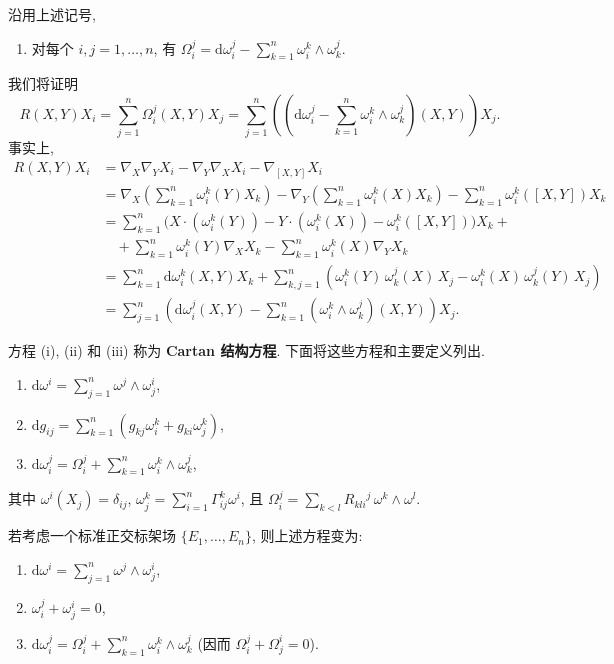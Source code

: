 \begin{RiemannProposition}\label{prop:cartan-equation-for-curvature-forms}
沿用上述记号,
\begin{enumerate}[label=(\roman*),start=3,leftmargin=*]
\item 对每个 $i,j=1,\ldots,n$, 有 $\Omega_i^j=\mathrm{d}\omega_i^j-\sum_{k=1}^n\omega_i^k\wedge\omega_k^j$.
\end{enumerate}
\end{RiemannProposition}

\begin{RiemannProof}
我们将证明
\[
  R(X,Y)X_i=\sum_{j=1}^n\Omega_i^j(X,Y)X_j
  =\sum_{j=1}^n\left(\left(\mathrm{d}\omega_i^j-\sum_{k=1}^n\omega_i^k\wedge\omega_k^j\right)(X,Y)\right)X_j.
\]
事实上,
\begin{align*}
  R(X,Y)X_i&=\nabla_X\nabla_YX_i-\nabla_Y\nabla_XX_i-\nabla_{[X,Y]}X_i\\
  &=\nabla_X\left(\sum_{k=1}^n\omega_i^k(Y)X_k\right)
    -\nabla_Y\left(\sum_{k=1}^n\omega_i^k(X)X_k\right)
    -\sum_{k=1}^n\omega_i^k([X,Y])X_k\\
  &=\sum_{k=1}^n\bigl(X\cdot(\omega_i^k(Y))-Y\cdot(\omega_i^k(X))-\omega_i^k([X,Y])\bigr)X_k+{}\\
  &\quad+\sum_{k=1}^n\omega_i^k(Y)\nabla_XX_k-\sum_{k=1}^n\omega_i^k(X)\nabla_YX_k\\
  &=\sum_{k=1}^n\mathrm{d}\omega_i^k(X,Y)X_k
    +\sum_{k,j=1}^n\left(\omega_i^k(Y)\,\omega_k^j(X)\,X_j-\omega_i^k(X)\,\omega_k^j(Y)\,X_j\right)\\
  &=\sum_{j=1}^n\left(\mathrm{d}\omega_i^j(X,Y)-\sum_{k=1}^n(\omega_i^k\wedge\omega_k^j)(X,Y)\right)X_j.
\end{align*}
\end{RiemannProof}

方程 (i), (ii) 和 (iii) 称为 \textbf{Cartan 结构方程}. 下面将这些方程和主要定义列出.
\begin{enumerate}[label=(\roman*),leftmargin=*]
\item $\mathrm{d}\omega^i=\sum_{j=1}^n\omega^j\wedge\omega_j^i$,
\item $\mathrm{d}g_{ij}=\sum_{k=1}^n(g_{kj}\omega_i^k+g_{ki}\omega_j^k)$,
\item $\mathrm{d}\omega_i^j=\Omega_i^j+\sum_{k=1}^n\omega_i^k\wedge\omega_k^j$,
\end{enumerate}
其中 $\omega^i(X_j)=\delta_{ij}$, $\omega_j^k=\sum_{i=1}^n\Gamma_{ij}^k\omega^i$, 且 $\Omega_i^j=\sum_{k<l}R_{kli}{}^j\,\omega^k\wedge\omega^l$.

\begin{RiemannRemark}\label{rem:cartan-equations-in-orthonormal-frame}
若考虑一个标准正交标架场 $\{E_1,\ldots,E_n\}$, 则上述方程变为:
\begin{enumerate}[label=(\roman*),leftmargin=*]
\item $\mathrm{d}\omega^i=\sum_{j=1}^n\omega^j\wedge\omega_j^i$,
\item $\omega_i^j+\omega_j^i=0$,
\item $\mathrm{d}\omega_i^j=\Omega_i^j+\sum_{k=1}^n\omega_i^k\wedge\omega_k^j$ (因而 $\Omega_i^j+\Omega_j^i=0$).
\end{enumerate}
\end{RiemannRemark}


